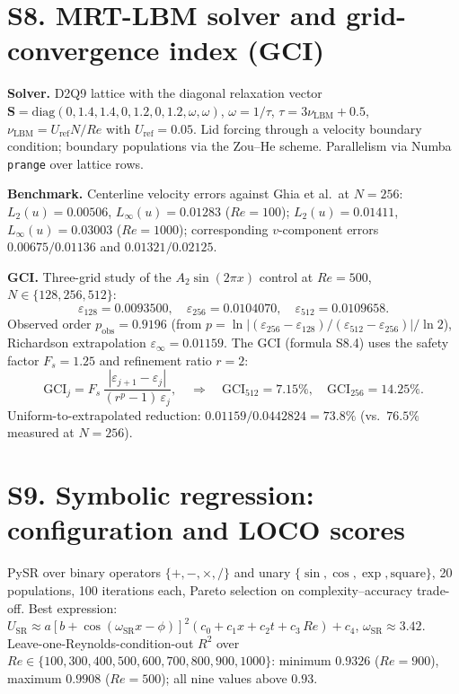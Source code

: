 \documentclass[11pt]{article}
\begin{document}
\section{S8. MRT-LBM solver and grid-convergence index (GCI)}
\label{sec:S8}

\textbf{Solver.} D2Q9 lattice with the diagonal relaxation vector
$\mathbf{S}=\mathrm{diag}(0,1.4,1.4,0,1.2,0,1.2,\omega,\omega)$,
$\omega=1/\tau$, $\tau=3\nu_{\mathrm{LBM}}+0.5$,
$\nu_{\mathrm{LBM}}=U_{\mathrm{ref}}N/Re$ with $U_{\mathrm{ref}}=0.05$.
Lid forcing through a velocity boundary condition; boundary populations via
the Zou--He scheme. Parallelism via Numba \texttt{prange} over lattice rows.

\textbf{Benchmark.} Centerline velocity errors against Ghia et al.\ at
$N=256$: $L_2(u)=0.00506$, $L_\infty(u)=0.01283$ ($Re=100$);
$L_2(u)=0.01411$, $L_\infty(u)=0.03003$ ($Re=1000$); corresponding
$v$-component errors $0.00675/0.01136$ and $0.01321/0.02125$.

\textbf{GCI.} Three-grid study of the $A_2\sin(2\pi x)$ control at $Re=500$,
$N\in\{128,256,512\}$:
\[
\varepsilon_{128}=0.0093500,\quad
\varepsilon_{256}=0.0104070,\quad
\varepsilon_{512}=0.0109658 .
\]
Observed order $p_{\mathrm{obs}}=0.9196$ (from
$p=\ln|(\varepsilon_{256}-\varepsilon_{128})/(\varepsilon_{512}-\varepsilon_{256})|/\ln 2$),
Richardson extrapolation
$\varepsilon_{\infty}=0.01159$. The GCI (formula S8.4) uses the safety factor
$F_s=1.25$ and refinement ratio $r=2$:
\[
\mathrm{GCI}_{j}=F_s\,\frac{|\varepsilon_{j+1}-\varepsilon_{j}|}{(r^{p}-1)\,\varepsilon_{j}},
\quad\Rightarrow\quad
\mathrm{GCI}_{512}=7.15\%,\quad \mathrm{GCI}_{256}=14.25\% .
\]
Uniform-to-extrapolated reduction:
$0.01159/0.0442824=73.8\%$ (vs.\ $76.5\%$ measured at $N=256$).

\section{S9. Symbolic regression: configuration and LOCO scores}
\label{sec:S9}

PySR over binary operators $\{+,-,\times,/\}$ and unary
$\{\sin,\cos,\exp,\mathrm{square}\}$, 20 populations, 100 iterations each,
Pareto selection on complexity--accuracy trade-off. Best expression:
$U_{\mathrm{SR}}\approx a[b+\cos(\omega_{\mathrm{SR}}x-\phi)]^2
(c_0+c_1x+c_2t+c_3\,Re)+c_4$, $\omega_{\mathrm{SR}}\approx3.42$.
Leave-one-Reynolds-condition-out $R^2$ over
$Re\in\{100,300,400,500,600,700,800,900,1000\}$: minimum $0.9326$ ($Re=900$),
maximum $0.9908$ ($Re=500$); all nine values above $0.93$.
\end{document}
